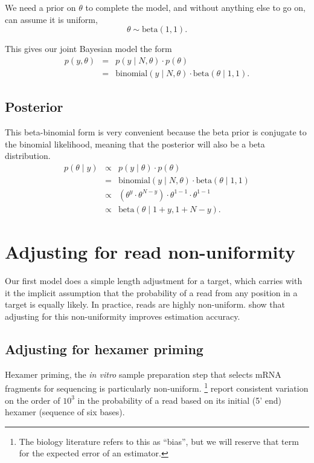 \documentclass[11pt]{report}
\begin{document}
We need a prior on $\theta$ to complete the model, and without
anything else to go on, can assume it is uniform,
%
\[
  \theta \sim \textrm{beta}(1, 1).
\]
%

This gives our joint Bayesian model the form
%
\begin{eqnarray*}
  p(y, \theta)
  & = & p(y \mid N, \theta) \cdot p(\theta)
  \\
  & = & \textrm{binomial}(y \mid N, \theta) \cdot \textrm{beta}(\theta \mid 1, 1).
\end{eqnarray*}
%

\subsection{Posterior}

This beta-binomial form is very convenient because the beta prior is
conjugate to the binomial likelihood, meaning that the posterior will
also be a beta distribution.
%
\begin{eqnarray*}
  p(\theta \mid y)
  & \propto &
              p(y \mid \theta) \cdot p(\theta)
  \\
  & = & \textrm{binomial}(y \mid N, \theta) \cdot \textrm{beta}(\theta \mid 1, 1)
  \\
  & \propto &
              \left( \theta^y \cdot \theta^{N - y} \right)
              \cdot
              \theta^{1 - 1} \cdot \theta^{1 - 1}
  \\
  & \propto & \textrm{beta}(\theta \mid 1 + y, 1 + N - y).
\end{eqnarray*}


\section{Adjusting for read non-uniformity}

Our first model does a simple length adjustment for a target, which
carries with it the implicit assumption that the probability of a read
from any position in a target is equally likely.  In practice, reads
are highly non-uniform.  \cite{roberts2011improving} show that
adjusting for this non-uniformity improves estimation accuracy.

\subsection{Adjusting for hexamer priming}

Hexamer priming, the \textit{in vitro} sample preparation step that
selects mRNA fragments for sequencing is particularly non-uniform.%
\footnote{The biology literature refers to this as ``bias'', but we
  will reserve that term for the expected error of an estimator.}
\cite{hansen2010biases} report consistent variation on the order of
$10^3$ in the probability of a read based on its initial (5' end)
hexamer (sequence of six bases).
\end{document}
